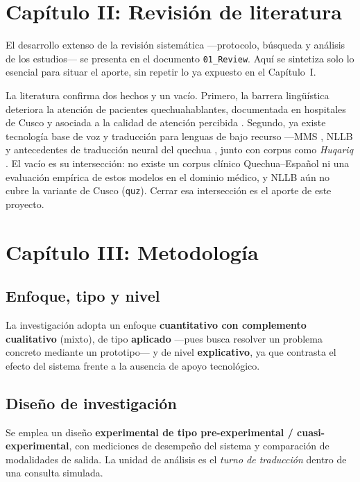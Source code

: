 \documentclass[12pt,a4paper]{article}
\begin{document}
\section{Cap{\'i}tulo II: Revisi{\'o}n de literatura}
El desarrollo extenso de la revisi{\'o}n sistem{\'a}tica ---protocolo, b{\'u}squeda y an{\'a}lisis
de los estudios--- se presenta en el documento \texttt{01\_Review}. Aqu{\'i} se sintetiza solo lo
esencial para situar el aporte, sin repetir lo ya expuesto en el Cap{\'i}tulo~I.

La literatura confirma dos hechos y un vac{\'i}o. Primero, la barrera ling{\"u}{\'i}stica
deteriora la atenci{\'o}n de pacientes quechuahablantes, documentada en hospitales de Cusco
\parencite{begazo2026} y asociada a la calidad de atenci{\'o}n percibida \parencite{cuaila2022}.
Segundo, ya existe tecnolog{\'i}a base de voz y traducci{\'o}n para lenguas de bajo recurso
---MMS \parencite{pratap2024mms}, NLLB \parencite{costajussa2022nllb} y antecedentes de
traducci{\'o}n neural del quechua \parencite{ortega2020quechua,mager2021americasnlp}, junto con
corpus como \emph{Huqariq} \parencite{zevallos2022huqariq}. El vac{\'i}o es su intersecci{\'o}n:
no existe un corpus cl{\'i}nico Quechua--Espa{\~n}ol ni una evaluaci{\'o}n emp{\'i}rica de estos
modelos en el dominio m{\'e}dico, y NLLB a{\'u}n no cubre la variante de Cusco (\texttt{quz}).
Cerrar esa intersecci{\'o}n es el aporte de este proyecto.

\section{Cap{\'i}tulo III: Metodolog{\'i}a}

\subsection{Enfoque, tipo y nivel}
La investigaci{\'o}n adopta un enfoque \textbf{cuantitativo con complemento cualitativo}
(mixto), de tipo \textbf{aplicado} ---pues busca resolver un problema concreto mediante un
prototipo--- y de nivel \textbf{explicativo}, ya que contrasta el efecto del sistema frente a la
ausencia de apoyo tecnol{\'o}gico.

\subsection{Dise{\~n}o de investigaci{\'o}n}
Se emplea un dise{\~n}o \textbf{experimental de tipo pre-experimental / cuasi-experimental},
con mediciones de desempe{\~n}o del sistema y comparaci{\'o}n de modalidades de salida. La
unidad de an{\'a}lisis es el \emph{turno de traducci{\'o}n} dentro de una consulta simulada.
\end{document}
